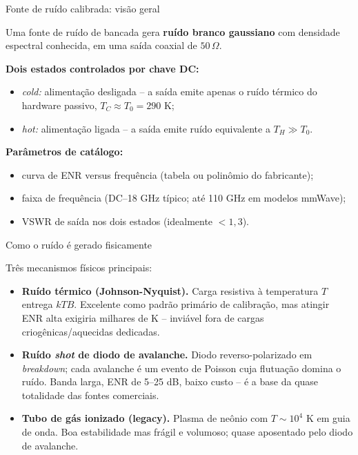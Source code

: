 \begin{frame}{Fonte de ruído calibrada: visão geral}

Uma fonte de ruído de bancada gera \textbf{ruído branco gaussiano} com densidade espectral conhecida, em uma saída coaxial de $50\,\Omega$.

\textbf{Dois estados controlados por chave DC:}
\begin{itemize}
\item \emph{cold:} alimentação desligada -- a saída emite apenas o ruído térmico do hardware passivo, $T_C \approx T_0 = 290$ K;
\item \emph{hot:} alimentação ligada -- a saída emite ruído equivalente a $T_H \gg T_0$.
\end{itemize}

\textbf{Parâmetros de catálogo:}
\begin{itemize}
\item curva de ENR versus frequência (tabela ou polinômio do fabricante);
\item faixa de frequência (DC--18 GHz típico; até 110 GHz em modelos mmWave);
\item VSWR de saída nos dois estados (idealmente $< 1{,}3$).
\end{itemize}

\end{frame}


\begin{frame}{Como o ruído é gerado fisicamente}

Três mecanismos físicos principais:

\begin{itemize}
\item \textbf{Ruído térmico (Johnson-Nyquist).} Carga resistiva à temperatura $T$ entrega $kTB$. Excelente como padrão primário de calibração, mas atingir ENR alta exigiria milhares de K -- inviável fora de cargas criogênicas/aquecidas dedicadas.
\item \textbf{Ruído \emph{shot} de diodo de avalanche.} Diodo reverso-polarizado em \emph{breakdown}; cada avalanche é um evento de Poisson cuja flutuação domina o ruído. Banda larga, ENR de 5--25 dB, baixo custo -- é a base da quase totalidade das fontes comerciais.
\item \textbf{Tubo de gás ionizado (legacy).} Plasma de neônio com $T \sim 10^4$ K em guia de onda. Boa estabilidade mas frágil e volumoso; quase aposentado pelo diodo de avalanche.
\end{itemize}

\end{frame}


